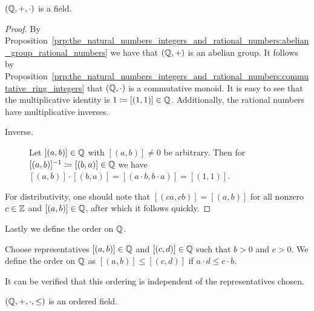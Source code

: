 \documentclass[../main.tex]{subfiles}
\begin{document}
\begin{proposition}\label{prp:the_natural_numbers_integers_and_rational_numbers:field_rational_numbers}
    $(\mathbb{Q},+,\cdot)$ is a field.
\end{proposition}
\begin{proof}
    By Proposition~\ref{prp:the_natural_numbers_integers_and_rational_numbers:abelian_group_rational_numbers} we have that $(\mathbb{Q},+)$ is an abelian group. It follows by Proposition~\ref{prp:the_natural_numbers_integers_and_rational_numbers:commutative_ring_integers} that $(\mathbb{Q},\cdot)$ is a commutative monoid. It is easy to see that the multiplicative identity is $1\coloneq[(1,1)]\in\mathbb{Q}$. Additionally, the rational numbers have multiplicative inverses.
    \begin{description}
        \item[Inverse.] Let $[(a,b)]\in\mathbb{Q}$ with $[(a,b)]\neq0$ be arbitrary. Then for $[(a,b)]^{-1}\coloneq[(b,a)]\in\mathbb{Q}$ we have $[(a,b)]\cdot[(b,a)]=[(a\cdot b,b\cdot a)]=[(1,1)]$.
    \end{description}
    For distributivity, one should note that $[(ca,cb)]=[(a,b)]$ for all nonzero $c\in\mathbb{Z}$ and $[(a,b)]\in\mathbb{Q}$, after which it follows quickly.
\end{proof}
Lastly we define the order on $\mathbb{Q}$.
\begin{definition}
    Choose representatives $[(a,b)]\in\mathbb{Q}$ and $[(c,d)]\in\mathbb{Q}$ such that $b>0$ and $c>0$. We define the order on $\mathbb{Q}$ as $[(a,b)]\leq[(c,d)]$ if $a\cdot d\leq c\cdot b$.
\end{definition}
It can be verified that this ordering is independent of the representatives chosen.
\begin{proposition}\label{prp:the_natural_numbers_integers_and_rational_numbers:ordered_field_rational_numbers}
    $(\mathbb{Q},+,\cdot,\leq)$ is an ordered field.
\end{proposition}
\end{document}
